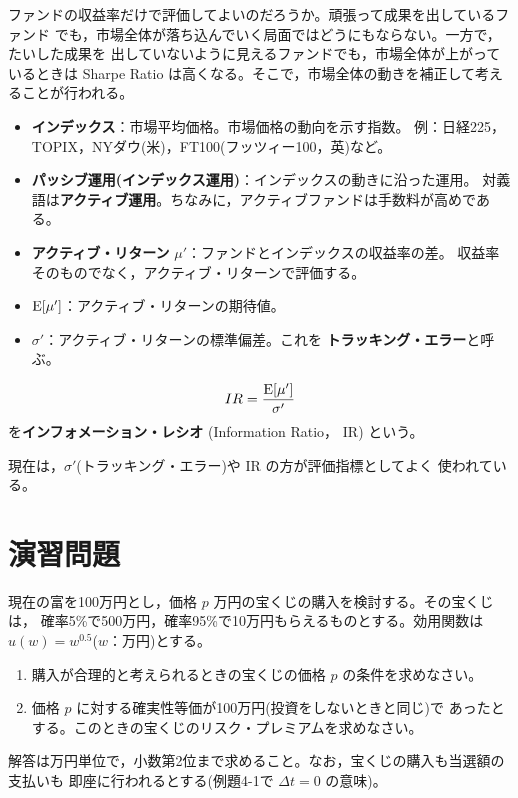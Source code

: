 ファンドの収益率だけで評価してよいのだろうか。頑張って成果を出しているファンド
でも，市場全体が落ち込んでいく局面ではどうにもならない。一方で，たいした成果を
出していないように見えるファンドでも，市場全体が上がっているときは Sharpe Ratio
は高くなる。そこで，市場全体の動きを補正して考えることが行われる。

\begin{itemize}
\item \textbf{インデックス}：市場平均価格。市場価格の動向を示す指数。
例：日経225，TOPIX，NYダウ(米)，FT100(フッツィー100，英)など。
\item \textbf{パッシブ運用(インデックス運用)}：インデックスの動きに沿った運用。
対義語は\textbf{アクティブ運用}。ちなみに，アクティブファンドは手数料が高めである。
\item \textbf{アクティブ・リターン} $\mu'$：ファンドとインデックスの収益率の差。
収益率そのものでなく，アクティブ・リターンで評価する。
\item $\mathrm{E}[\mu']$：アクティブ・リターンの期待値。
\item $\sigma'$：アクティブ・リターンの標準偏差。これを
\textbf{トラッキング・エラー}と呼ぶ。
\end{itemize}

\begin{definition}
\begin{equation}
IR = \frac{\mathrm{E}[\mu']}{\sigma'}
\end{equation}
を\textbf{インフォメーション・レシオ} (Information Ratio， IR) という。
\end{definition}

現在は，$\sigma'$(トラッキング・エラー)や IR の方が評価指標としてよく
使われている。

\section{演習問題}

\begin{exercise}[問題4-1]
現在の富を100万円とし，価格 $p$ 万円の宝くじの購入を検討する。その宝くじは，
確率5\%で500万円，確率95\%で10万円もらえるものとする。効用関数は
$u(w) = w^{0.5}$($w$：万円)とする。
\begin{enumerate}
\item[(1)] 購入が合理的と考えられるときの宝くじの価格 $p$ の条件を求めなさい。
\item[(2)] 価格 $p$ に対する確実性等価が100万円(投資をしないときと同じ)で
あったとする。このときの宝くじのリスク・プレミアムを求めなさい。
\end{enumerate}
解答は万円単位で，小数第2位まで求めること。なお，宝くじの購入も当選額の支払いも
即座に行われるとする(例題4-1で $\Delta t = 0$ の意味)。
\end{exercise}

